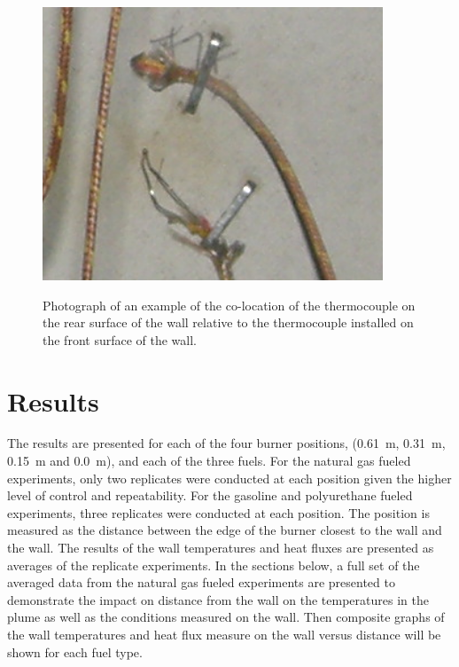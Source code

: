 \documentclass[twoside]{uocthesis}
\begin{document}
{\begin{figure}
	\centering
	\includegraphics[width=4.0in]{../Figures/Instrumented_Wall_Detail_Rear_TC_photo}\\
	\caption[Photograph of an example of the co-location of the thermocouple on the rear surface of the wall relative to the thermocouple installed on the front surface of the wall]{Photograph of an example of the co-location of the thermocouple on the rear surface of the wall relative to the thermocouple installed on the front surface of the wall.}
	\label{Instrumented_Wall_Detail_Rear_TC_photo}
\end{figure}

\section{Results}

The results are presented for each of the four burner positions, (0.61~m, 0.31~m, 0.15~m and 0.0~m), and each of the three fuels.  For the natural gas fueled experiments, only two replicates were conducted at each position given the higher level of control and repeatability.  For the gasoline and polyurethane fueled experiments, three replicates were conducted at each position. The position is measured as the distance between the edge of the burner closest to the wall and the wall.  The results of the wall temperatures and heat fluxes are presented as averages of the replicate experiments.  In the sections below, a full set of the averaged data from the natural gas fueled experiments are presented to demonstrate the impact on distance from the wall on the temperatures in the plume as well as the conditions measured on the wall. Then composite graphs of the wall temperatures and heat flux measure on the wall versus distance will be shown for each fuel type.

}
\end{document}

